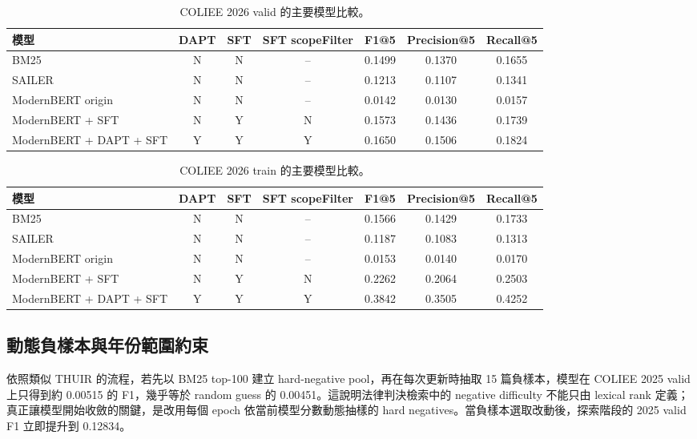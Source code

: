 \begin{table}[t]
  \centering
  \scriptsize
  \begin{tabular}{lcccccc}
    \toprule
    模型 & DAPT & SFT & SFT scopeFilter & F1@5 & Precision@5 & Recall@5 \\
    \midrule
    BM25 & N & N & -- & 0.1499 & 0.1370 & 0.1655 \\
    SAILER & N & N & -- & 0.1213 & 0.1107 & 0.1341 \\
    ModernBERT origin & N & N & -- & 0.0142 & 0.0130 & 0.0157 \\
    ModernBERT + SFT & N & Y & N & 0.1573 & 0.1436 & 0.1739 \\
    ModernBERT + DAPT + SFT & Y & Y & Y & 0.1650 & 0.1506 & 0.1824 \\
    \bottomrule
  \end{tabular}
  \caption{COLIEE 2026 valid 的主要模型比較。}
  \label{tab:main-results-valid}
\end{table}

\begin{table}[t]
  \centering
  \scriptsize
  \begin{tabular}{lcccccc}
    \toprule
    模型 & DAPT & SFT & SFT scopeFilter & F1@5 & Precision@5 & Recall@5 \\
    \midrule
    BM25 & N & N & -- & 0.1566 & 0.1429 & 0.1733 \\
    SAILER & N & N & -- & 0.1187 & 0.1083 & 0.1313 \\
    ModernBERT origin & N & N & -- & 0.0153 & 0.0140 & 0.0170 \\
    ModernBERT + SFT & N & Y & N & 0.2262 & 0.2064 & 0.2503 \\
    ModernBERT + DAPT + SFT & Y & Y & Y & 0.3842 & 0.3505 & 0.4252 \\
    \bottomrule
  \end{tabular}
  \caption{COLIEE 2026 train 的主要模型比較。}
  \label{tab:main-results-train}
\end{table}

\subsection{動態負樣本與年份範圍約束}

依照類似 THUIR 的流程，若先以 BM25 top-100 建立 hard-negative pool，再在每次更新時抽取 15 篇負樣本，模型在 COLIEE 2025 valid 上只得到約 0.00515 的 F1，幾乎等於 random guess 的 0.00451。這說明法律判決檢索中的 negative difficulty 不能只由 lexical rank 定義；真正讓模型開始收斂的關鍵，是改用每個 epoch 依當前模型分數動態抽樣的 hard negatives。當負樣本選取改動後，探索階段的 2025 valid F1 立即提升到 0.12834。

